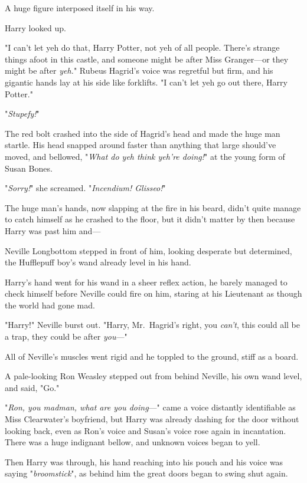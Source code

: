 A huge figure interposed itself in his way.

Harry looked up.

"I can't let yeh do that, Harry Potter, not yeh of all people. There's strange
things afoot in this castle, and someone might be after Miss Granger---or they
might be after \emph{yeh.}" Rubeus Hagrid's voice was regretful but firm, and
his gigantic hands lay at his side like forklifts. "I can't let yeh go out
there, Harry Potter."

"\emph{Stupefy!}"

The red bolt crashed into the side of Hagrid's head and made the huge man
startle. His head snapped around faster than anything that large should've
moved, and bellowed, "\emph{What do yeh think yeh're doing!}" at the young form
of Susan Bones.

"\emph{Sorry!}" she screamed. "\emph{Incendium! Glisseo!}"

The huge man's hands, now slapping at the fire in his beard, didn't quite
manage to catch himself as he crashed to the floor, but it didn't matter by
then because Harry was past him and---

Neville Longbottom stepped in front of him, looking desperate but determined,
the Hufflepuff boy's wand already level in his hand.

Harry's hand went for his wand in a sheer reflex action, he barely managed to
check himself before Neville could fire on him, staring at his Lieutenant as
though the world had gone mad.

"Harry!" Neville burst out. "Harry, Mr.~Hagrid's right, you \emph{can't}, this
could all be a trap, they could be after \emph{you}\mbox{---}"

All of Neville's muscles went rigid and he toppled to the ground, stiff as a
board.

A pale-looking Ron Weasley stepped out from behind Neville, his own wand level,
and said, "Go."

"\emph{Ron, you madman, what are you doing}\mbox{---}" came a voice distantly
identifiable as Miss Clearwater's boyfriend, but Harry was already dashing for
the door without looking back, even as Ron's voice and Susan's voice rose again
in incantation. There was a huge indignant bellow, and unknown voices began to
yell.

Then Harry was through, his hand reaching into his pouch and his voice was
saying "\emph{broomstick}", as behind him the great doors began to swing shut
again.

